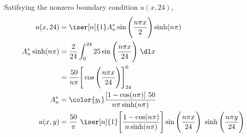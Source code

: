 \begin{enumerate}
          Satifsying the nonzero boundary condition $ u(x, 24) $,
          \begin{align}
              u(x, 24)          & = \iser[n]{1} A_n^* \sin\Bigg(
              \frac{n\pi x}{2} \Bigg) \sinh(n\pi)                                   \\
              A_n^* \sinh(n\pi) & = \frac{2}{24} \int_{0}^{24} 25\sin\Bigg(
              \frac{n\pi x}{24}\Bigg)\ \dl x                                        \\
                                & = \frac{50}{n\pi} \Bigg[ \cos\Bigg( \frac{n\pi x}
              {24}\Bigg) \Bigg]_{24}^0                                              \\
              A_n^*             & = \color{y_t} \frac{[1 - \cos(n\pi)]\ 50}
              {n\pi \sinh(n\pi)}                                                    \\
              u(x, y)           & = \frac{50}{\pi}\ \iser[n]{1} \Bigg[
                  \frac{1 - \cos(n\pi)}{n\sinh(n\pi)}\Bigg] \sin\Bigg( \frac{n\pi x}
              {24}\Bigg)\ \sinh\Bigg( \frac{n\pi y}{24} \Bigg)
          \end{align}


\end{enumerate}
